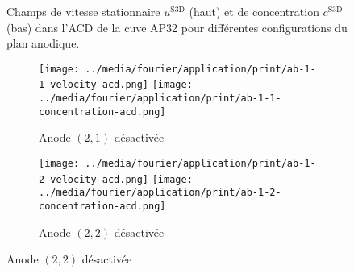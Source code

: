 \begin{figure}[!h]
\begin{center}
    \caption{Champs de vitesse stationnaire $u^{\mathrm{S3D}}$ (haut) et de
      concentration $c^\mathrm{S3D}$ (bas) dans l'ACD de la cuve
      AP32 pour différentes configurations du plan anodique.}
    \label{fig:f3d-deactivated-a}
  \end{center}
\end{figure}

\begin{figure}[!h]
  \begin{center}
    \begin{subfigure}[t]{\textwidth}
      \begin{center}
        \texttt{[image: ../media/fourier/application/print/ab-1-1-velocity-acd.png]}
        \texttt{[image: ../media/fourier/application/print/ab-1-1-concentration-acd.png]}
        \caption{Anode $(2,1)$ désactivée}
      \end{center}
    \end{subfigure}
    \begin{subfigure}[t]{\textwidth}
      \begin{center}
        \texttt{[image: ../media/fourier/application/print/ab-1-2-velocity-acd.png]}
        \texttt{[image: ../media/fourier/application/print/ab-1-2-concentration-acd.png]}
        \caption{Anode $(2,2)$ désactivée}
      \end{center}
    \end{subfigure}


\end{center}
\end{figure}
